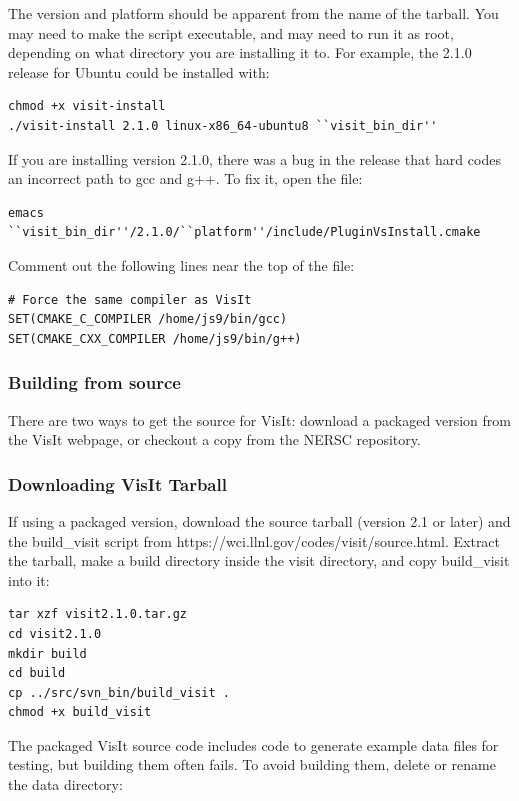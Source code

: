 \documentclass[12pt]{article}
\begin{document}
The version and platform should be apparent from the name of the
tarball.  You may need to make the script executable, and may need to
run it as root, depending on what directory you are installing it to.
For example, the 2.1.0 release for Ubuntu could be installed with:
\begin{verbatim}
chmod +x visit-install
./visit-install 2.1.0 linux-x86_64-ubuntu8 ``visit_bin_dir''
\end{verbatim}

If you are installing version 2.1.0, there was a bug in the release that
hard codes an incorrect path to gcc and g++.  To fix it, open the file:
\begin{verbatim}
emacs ``visit_bin_dir''/2.1.0/``platform''/include/PluginVsInstall.cmake
\end{verbatim}

Comment out the following lines near the top of the file:
\begin{verbatim}
# Force the same compiler as VisIt
SET(CMAKE_C_COMPILER /home/js9/bin/gcc)
SET(CMAKE_CXX_COMPILER /home/js9/bin/g++)
\end{verbatim}

\subsubsection{Building from source}
\label{subsec:VisItVersion2_Build}

There are two ways to get the source for VisIt: download a packaged version from
the VisIt webpage, or checkout a copy from the NERSC repository.

\subsubsection{Downloading VisIt Tarball}
\label{subsec:VisItVersion2_tarball}

If using a packaged version, download the source tarball (version 2.1
or later) and the build\_visit script from
https://wci.llnl.gov/codes/visit/source.html.  Extract the tarball,
make a build directory inside the visit directory, and copy
build\_visit into it:

\begin{verbatim}
tar xzf visit2.1.0.tar.gz
cd visit2.1.0
mkdir build
cd build
cp ../src/svn_bin/build_visit .
chmod +x build_visit
\end{verbatim}

The packaged VisIt source code includes code to generate example data
files for testing, but building them often fails.  To avoid building them,
delete or rename the data directory:
\end{document}
